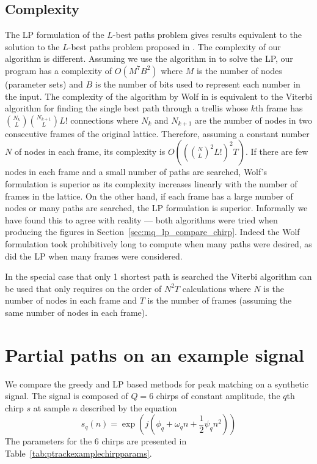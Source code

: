 \documentclass{article}
\begin{document}
\begin{sloppy}
\subsection{Complexity}

The LP formulation of the $L$-best paths problem gives results equivalent to the
solution to the $L$-best paths problem proposed in \cite{wolf1989finding}. The
complexity of our algorithm is different.  Assuming we
use the algorithm in \cite{karmarkar1984new} to solve the LP, our program has a
complexity of $O(M^{7}B^{2})$ where $M$ is the number of nodes (parameter sets)
and $B$ is the number of bits used to represent each number in the input. The
complexity of the algorithm by Wolf in \cite{wolf1989finding} is equivalent to
the Viterbi algorithm for finding the single best path through a trellis whose
$k$th frame has $\binom{N_{k}}{L}\binom{N_{k+1}}{L}L!$ connections where $N_{k}$
and $N_{k+1}$ are the number of nodes in two consecutive frames of the original
lattice. Therefore, assuming a constant number $N$ of nodes in each frame, its
complexity is $O((\binom{N}{L}^{2}L!)^{2}T)$. If there are few nodes in each
frame and a small number of paths are searched, Wolf's formulation is superior
as its complexity increases linearly with the number of frames in the lattice.
On the other hand, if each frame has a large number of nodes or many paths are
searched, the LP formulation is superior.  Informally we have found this to
agree with reality --- both algorithms were tried when producing the figures in
Section~\ref{sec:mq_lp_compare_chirp}.  Indeed the Wolf formulation took
prohibitively long to compute when many paths were desired, as did the LP when
many frames were considered.

In the special case that only 1 shortest path is searched the Viterbi algorithm
\cite{forney1973viterbi} can be used that only requires on the order of $N^{2}T$
calculations \cite{rabiner1989tutorial} where $N$ is the number of nodes in each
frame and $T$ is the number of frames (assuming the same number of nodes in each
frame).

\section{Partial paths on an example signal\label{sec:mq_lp_compare_chirp}}

We compare the greedy and LP based methods for peak matching on a synthetic
signal. The signal is composed of $Q=6$ chirps of constant amplitude, the $q$th
chirp $s$ at sample $n$ described by the equation
\[
    s_{q}(n) = \exp(j(\phi_{q} + \omega_{q}n +
    \frac{1}{2} \psi_{q} n^{2}))
\]
The parameters for the 6 chirps are presented in
Table~\ref{tab:ptrackexamplechirpparams}.


\end{sloppy}
\end{document}
